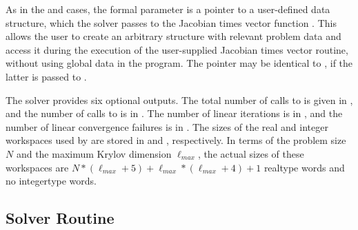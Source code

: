 \begin{itemize}
  As
  in the {\cvdense} and {\cvband} cases,  the  formal parameter
   is a pointer to a user-defined data structure, which
  the {\cvspgmr} solver passes to the Jacobian times vector function .  
  This allows the user to create an arbitrary structure with relevant problem
  data and access it during the execution of the user-supplied Jacobian times
  vector routine, without using global data in the program.  The pointer
   may be identical to , if the latter is
  passed to .
  
  
  The {\cvspgmr} solver provides six optional outputs.
  The total number of calls to  is given in \id{iopt[}\id{]},
  and the number of calls to  is in \id{iopt[}\id{]}.
  The number of linear iterations is in \id{iopt[}\id{]},
  and the number of linear convergence failures is in \id{iopt[}\id{]}.
  The sizes of the real and integer workspaces used by {\cvspgmr} are stored in
  \id{iopt[}\id{]} and \id{iopt[}\id{]}, respectively.
  In terms of the
  problem size $N$ and the maximum Krylov dimension $\ell_{max}$,
  the actual sizes of these workspaces are 
  $N*(\ell_{max} + 5) + \ell_{max}*(\ell_{max} + 4) + 1$ realtype words and
  no integertype words.
  
  

\end{itemize}


\subsection{{\cvodes} Solver Routine}\label{sss:cvode}

